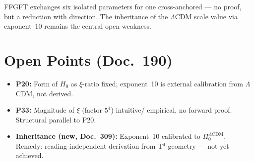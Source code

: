 \medskip
FFGFT exchanges six isolated parameters for one cross-anchored —
no proof, but a reduction with direction. The inheritance of the
$\Lambda$CDM scale value via exponent~10 remains the central open
weakness.

\chapter{Open Points (Doc.~190)}

\begin{itemize}
  \item \textbf{P20:} Form of $H_0$ as $\xi$-ratio fixed; exponent~10
        is external calibration from $\Lambda$CDM, not derived.
  \item \textbf{P33:} Magnitude of $\xi$ (factor $5^4$) intuitive/
        empirical, no forward proof. Structural parallel to P20.
  \item \textbf{Inheritance (new, Doc.~309):} Exponent~10 calibrated
        to $H_0^{\Lambda\text{CDM}}$. Remedy: reading-independent
        derivation from T$^4$ geometry — not yet achieved.
\end{itemize}
